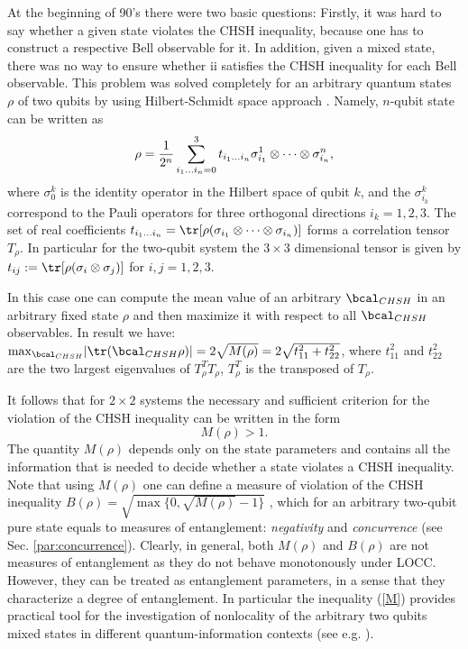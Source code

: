 \documentclass[rmp,12pt,preprint]{revtex4-2}
\begin{document}
At the beginning of 90's there were two basic questions: Firstly, it
was hard to say whether a given state violates the CHSH inequality,
because one has to construct a respective Bell observable for it. In
addition, given a mixed state, there was no way to ensure whether ii
satisfies the CHSH inequality for each Bell observable.  This problem
was solved completely for an arbitrary quantum states $\rho $ of two
qubits by using Hilbert-Schmidt space approach \cite
{HHH1995-bell}. Namely, $n$-qubit state can be written as
\begin{equation}
\rho
={1\over 2^n}\sum^3_{i_1...i_n=0}t_{i_1...i_n} \sigma^1_{i_1}\otimes
\cdots\otimes \sigma^n_{i_n}, \label{stan}
\end{equation}
where $\sigma _0^k$ is the identity operator in the Hilbert space of
qubit $k$, and the $\sigma_{i_k}^k$ correspond to the Pauli operators
for three orthogonal directions $i_k=1,2,3$. The set of real
coefficients $t_{i_1...i_n}= {\tr}[\rho (\sigma _{i_1}\otimes
\cdots\otimes \sigma _{i_n})]$ forms a correlation tensor $T_\rho$. In
particular for the two-qubit system the $3\times 3$ dimensional tensor
is given by $t_{ij}:={\tr}[ \rho (\sigma_{i} \otimes \sigma_{j})]$ for
$i,j=1,2,3$.

In this case one can compute the mean value of an arbitrary
$\bcal_{CHSH}$ in an arbitrary fixed state $\rho$ and then maximize
it with respect to all $\bcal_{CHSH}$ observables. In result we
have: ${\max}_{\bcal_{CHSH}}|{\tr}(\bcal_{CHSH}\rho )|=
2\sqrt{M(\rho)}=2\sqrt{t^2_{11} +t^2_{22}}$, where  $t^2_{11}$ and
$t^2_{22}$ are the two largest eigenvalues of $T^T_\rho T_\rho $,
$T^T_\rho $ is the transposed of $T_\rho $.

It follows that for $2\times2$ systems the necessary and sufficient
criterion for the violation of the CHSH inequality can be written in
the form
\begin{equation}
 M(\rho )> 1. \label{M}
\end{equation}
The quantity $M(\rho )$ depends only on the state parameters and
contains all the information that is needed to decide whether a state
violates a CHSH inequality. Note that using $M(\rho )$ one can define
a measure of violation of the CHSH inequality $B(\rho )=\sqrt
{\max\{0,\sqrt{M(\rho )}-1\}}$ \cite {Miranowicz}, which for an
arbitrary two-qubit pure state equals to measures of entanglement:
{\it negativity} and {\it concurrence} (see Sec. \ref{par:concurrence}).
Clearly, in general, both $M(\rho )$ and $B(\rho )$ are not measures
of entanglement as they do not behave monotonously under LOCC.
However, they can be treated as entanglement parameters, in a sense
that they characterize a degree of entanglement. In particular the
inequality (\ref{M}) provides practical tool for the investigation of
nonlocality of the arbitrary two qubits mixed states in different
quantum-information contexts (see e.g. \cite{Z,Scarani1,Hyllus}).
\end{document}
